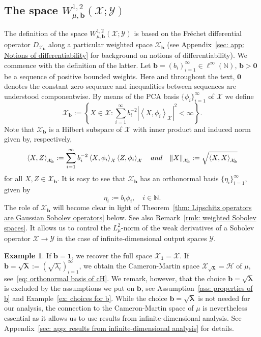 \documentclass[namedate,webpdf]{ima-authoring-template-blank}
\newcommand*{\nm}[1]{{\left\|#1\right \|}}
\newcommand{\abs}[1]{\left|#1\right|}
\newcommand*{\ip}[2]{\left\langle #1, #2 \right\rangle}
\newcounter{counter}
\numberwithin{counter}{section}
\numberwithin{equation}{section}
\theoremstyle{plain}
\theoremstyle{definition}
\newtheorem{example}[counter]{Example}
\newcommand*{\cH}{\mathcal{H}}
\newcommand*{\cX}{\mathcal{X}}
\newcommand*{\cY}{\mathcal{Y}}
\newcommand*{\bbN}{\mathbb{N}}
\theoremstyle{thmstyletwo}
\begin{document}
\subsection{The space \texorpdfstring{\(W_{\mu, \bm{b}}^{1, 2}(\cX; \cY)\)}{W\_\{mu, b\}\string^\{1,2\}(X;Y)}}
\label{subsec: the space W^12_mu}

The definition of the space \(W_{\mu, \bm{b}}^{1, 2}(\cX; \cY)\) is based on the Fréchet differential operator \(D_{\cX_{\bm{b}}}\) along a particular weighted space \(\cX_{\bm{b}}\) (see Appendix~\ref{sec: app: Notions of differentiability} for background on notions of differentiability). 
We commence with the definition of the latter.
Let \(\bm{b} = (b_i)_{i=1}^{\infty} \in \ell^{\infty}(\bbN)\), \(\bm{b} > \bm{0}\) be a sequence of positive bounded weights. Here and throughout the text, \( \bm{0} \) denotes the constant zero sequence and inequalities between sequences are understood componentwise. By means of the PCA basis \(\{\phi_i\}_{i=1}^{\infty}\) of \(\cX\) we define
\begin{equation}
\label{eq: weighted space cX_b}
    \cX_{\bm{b}} := \left\{X \in \cX: \sum_{i = 1}^{\infty} b_i^{-2} \abs{\ip{X}{\phi_i}_{\cX}}^2 < \infty\right\}.
\end{equation}
Note that \(\cX_{\bm{b}}\) is a Hilbert subspace of \(\cX\) with inner product and induced norm given by, respectively,
\[
\ip{X}{Z}_{\cX_{\bm{b}}} := \sum_{i = 1}^{\infty} b_i^{-2} \ip{X}{\phi_i}_{\cX} \ip{Z}{\phi_i}_{\cX} \quad \textup{and} \quad 
\nm{X}_{\cX_{\bm{b}}} := \sqrt{\ip{X}{X}_{\cX_{\bm{b}}}}
\]
for all \( X, Z \in \cX_{\bm{b}} \). It is easy to see that \(\cX_{\bm{b}}\) has an orthonormal basis \(\{\eta_i\}_{i=1}^{\infty}\), given by
\begin{equation}
\label{eq: orthonormal basis of cX_b}
    \eta_i := b_i \phi_i, \quad i\in\bbN.
\end{equation}
The role of \( \cX _{\bm{b}} \) will become clear in light of Theorem~\ref{thm: Lipschitz operators are Gaussian Sobolev operators} below. See also Remark~\ref{rmk: weighted Sobolev spaces}. It allows us to control the \( L^2_{\mu} \)-norm of the weak derivatives of a Sobolev operator \( \cX \to \cY \) in the case of infinite-dimensional output spaces \( \cY \).
\begin{example}
\label{ex: important cases of cX_b}
    If \(\bm{b} = \bm{1}\), we recover the full space \(\cX_{\bm{1}} = \cX\). If \( \bm{b} = \sqrt{\bm{\lambda}} := (\sqrt{\lambda_i})_{i = 1}^{\infty} \), we obtain the Cameron-Martin space \(\cX_{\sqrt{\bm{\lambda}}} = \cH\) of \(\mu\), see~\eqref{eq: orthonormal basis of cH}. We remark, however, that the choice \( \bm{b} = \sqrt{\bm{\lambda}} \) is excluded by the assumptions we put on \( \bm{b} \), see Assumption~\ref{ass: properties of b} and Example~\ref{ex: choices for b}. While the choice \( \bm{b} = \sqrt{\bm{\lambda}}  \) is not needed for our analysis, the connection to the Cameron-Martin space of \( \mu \) is nevertheless essential as it allows us to use results from infinite-dimensional analysis. See Appendix~\ref{sec: app: results from infinite-dimensional analysis} for details.
\end{example}
\end{document}
